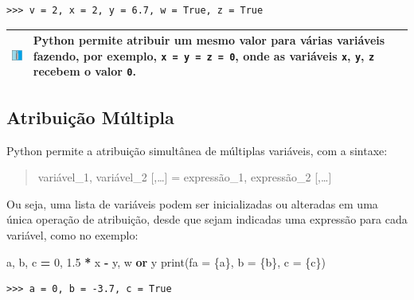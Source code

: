 \documentclass[
]{book}
\newenvironment{Shaded}{\begin{snugshade}}{\end{snugshade}}
\newcommand{\BuiltInTok}[1]{#1}
\newcommand{\DecValTok}[1]{\textcolor[rgb]{0.00,0.00,0.81}{#1}}
\newcommand{\FloatTok}[1]{\textcolor[rgb]{0.00,0.00,0.81}{#1}}
\newcommand{\KeywordTok}[1]{\textcolor[rgb]{0.13,0.29,0.53}{\textbf{#1}}}
\newcommand{\NormalTok}[1]{#1}
\newcommand{\OperatorTok}[1]{\textcolor[rgb]{0.81,0.36,0.00}{\textbf{#1}}}
\newcommand{\SpecialCharTok}[1]{\textcolor[rgb]{0.00,0.00,0.00}{#1}}
\newcommand{\SpecialStringTok}[1]{\textcolor[rgb]{0.31,0.60,0.02}{#1}}
\begin{document}
\begin{verbatim}
>>> v = 2, x = 2, y = 6.7, w = True, z = True
\end{verbatim}

\begin{longtable}[]{@{}
  >{\centering\arraybackslash}p{}
  >{\raggedright\arraybackslash}p{}@{}}
\toprule
\includegraphics{images/info.png} & Python permite atribuir um mesmo valor para várias variáveis fazendo, por exemplo, \texttt{x\ =\ y\ =\ z\ =\ 0}, onde as variáveis \texttt{x}, \texttt{y}, \texttt{z} recebem o valor \texttt{0}. \\
\midrule
\endhead
\bottomrule
\end{longtable}

\hypertarget{comput-atrib-multi}{%
\subsection{Atribuição Múltipla}\label{comput-atrib-multi}}

Python permite a atribuição simultânea de múltiplas variáveis, com a sintaxe:

\begin{quote}
variável\_1, variável\_2 {[},\ldots{]} = expressão\_1, expressão\_2 {[},\ldots{]}
\end{quote}

Ou seja, uma lista de variáveis podem ser inicializadas ou alteradas em uma única operação de atribuição, desde que sejam indicadas uma expressão para cada variável, como no exemplo:

\begin{Shaded}
\begin{Highlighting}[]
\NormalTok{a, b, c }\OperatorTok{=} \DecValTok{0}\NormalTok{, }\FloatTok{1.5} \OperatorTok{*}\NormalTok{ x }\OperatorTok{{-}}\NormalTok{ y,  w }\KeywordTok{or}\NormalTok{ y}
\BuiltInTok{print}\NormalTok{(}\SpecialStringTok{f\textquotesingle{}a = }\SpecialCharTok{\{a\}}\SpecialStringTok{, b = }\SpecialCharTok{\{b\}}\SpecialStringTok{, c = }\SpecialCharTok{\{c\}}\SpecialStringTok{\textquotesingle{}}\NormalTok{)}
\end{Highlighting}
\end{Shaded}

\begin{verbatim}
>>> a = 0, b = -3.7, c = True
\end{verbatim}
\end{document}
